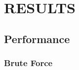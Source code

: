 \documentclass{thesis}
\begin{document}
\chapter{RESULTS}

\section{Performance}
\subsection{Brute Force}
\end{document}
